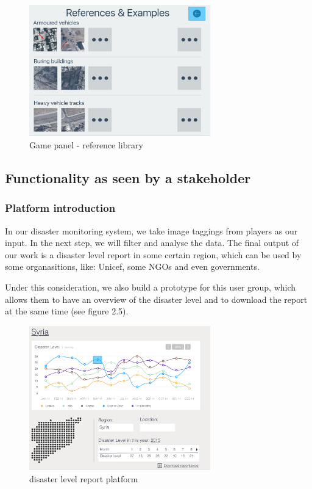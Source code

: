      \begin{figure}[htp]
      \centering
      \includegraphics[width=0.7\textwidth]{figures/function-player-3}
      \caption{Game panel - reference library}
      \label{fig:main-panel}
      \end{figure}

    \subsection{Functionality as seen by a stakeholder}
      \subsubsection{Platform introduction}
      In our disaster monitoring system, 
      we take image taggings from players as our input. 
      In the next step, 
      we will filter and analyse the data.
      The final output of our work is a disaster level report in some certain region,
      which can be used by some organasitions,
      like: Unicef, some NGOs and even governments.

      Under this consideration, 
      we also build a prototype for this user group,
      which allows them to have an overview of the disaster level and to download the report at the same time (see figure 2.5).

      \begin{figure}[htp]
      \centering
      \includegraphics[width=0.7\textwidth]{figures/function-stakeholder-1}
      \caption{disaster level report platform}
      \label{fig:main-panel}
      \end{figure}

